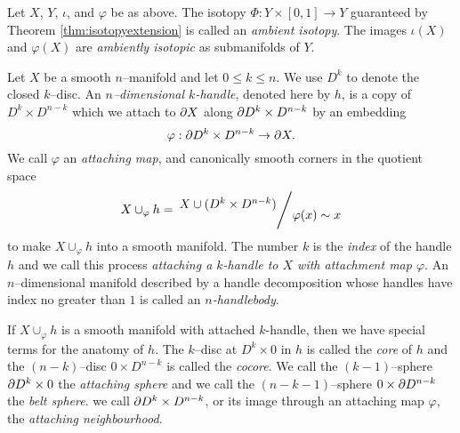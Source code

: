 \begin{defn}
	Let $X$, $Y$, $\iota$, and $\varphi$ be as above.
	The isotopy $\Phi:Y\times[0,1]\to Y$ guaranteed by Theorem \ref{thm:isotopyextension} is called an \emph{ambient isotopy}.
	The images $\iota(X)$ and $\varphi(X)$ are \emph{ambiently isotopic} as submanifolds of $Y$.
\end{defn}

\begin{defn}
	\label{def:handle}
	Let $X$ be a smooth $n$--manifold and let $0\leq k\leq n$.
	We use $D^k$ to denote the closed $k$--disc.
	An \emph{$n$--dimensional $k$-handle}, denoted here by $h$, is a copy of $D^k\times D^{n-k}$ which we attach to $\partial X$ along $\partial D^k\times D^{n-k}$ by an embedding
	\[
	  \varphi : \partial D^k \times D^{n-k} \to \partial X.
	\]
	We call $\varphi$ an \emph{attaching map}, and canonically smooth corners \cite{GompStip} in the quotient space
	\[
	  X\cup_\varphi h = \quotient{X \cup ( D^k\times D^{n-k} ) }{ \varphi(x) \sim x }
	\]
	to make $X\cup_\varphi h$ into a smooth manifold.
	The number $k$ is the \emph{index} of the handle $h$ and we call this process \emph{attaching a $k$-handle to $X$ with attachment map $\varphi$}.
	An $n$--dimensional manifold described by a handle decomposition whose handles have index no greater than $1$ is called an \emph{$n$-handlebody}.
\end{defn}

If $X\cup_\varphi h$ is a smooth manifold with attached $k$-handle, then we have special terms for the anatomy of $h$.
The $k$--disc at $D^k\times 0$ in $h$ is called the \emph{core} of $h$ and the $(n-k)$--disc $0 \times D^{n-k}$ is called the \emph{cocore}.
We call the $(k-1)$--sphere $\partial D^k \times 0$ the \emph{attaching sphere} and we call the $(n-k-1)$--sphere $ 0 \times \partial D^{n-k}$ the \emph{belt sphere}.
we call $\partial D^k\times D^{n-k}$, or its image through an attaching map $\varphi$, the \emph{attaching neighbourhood}.

